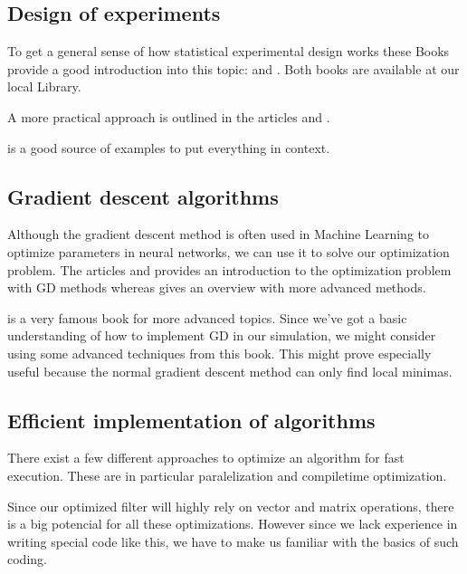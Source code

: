 \documentclass[titlepage, a4paper, 11pt]{scrartcl}
\begin{document}
        \subsection{Design of experiments}

        To get a general sense of how statistical experimental design works these Books provide a good introduction into this topic: \cite{siebertz2017statistische} and \cite{retzlaff1978statistische}.
        Both books are available at our local Library.

        A more practical approach is outlined in the articles \cite{hoevelmann1993statistische} and \cite{schweitzer1992off}.

        \cite{siebertz2017doe} is a good source of examples to put everything in context.

        \subsection{Gradient  descent  algorithms}

        Although the gradient descent method is often used in Machine Learning to optimize parameters in neural networks, we can use it to solve our optimization problem.
        The articles \cite{ketkar2017deep} and \cite{marti2005stochastic} provides an introduction to the optimization problem with GD methods whereas \cite{marti2005stochastic} gives an overview with more advanced methods.

        \cite{bishop2006pattern} is a very famous book for more advanced topics. Since we've got a basic understanding of how to implement GD in our simulation, we might consider using 
        some advanced techniques from this book. This might prove especially useful because the normal gradient descent method can only find local minimas.

        \subsection{Efficient implementation  of  algorithms}

        There exist a few different approaches to optimize an algorithm for fast execution. These are in particular paralelization and compiletime optimization.

        Since our optimized filter will highly rely on vector and matrix operations, there is a big potencial for all these optimizations. However since we lack experience in
        writing special code like this, we have to make us familiar with the basics of such coding.
\end{document}
